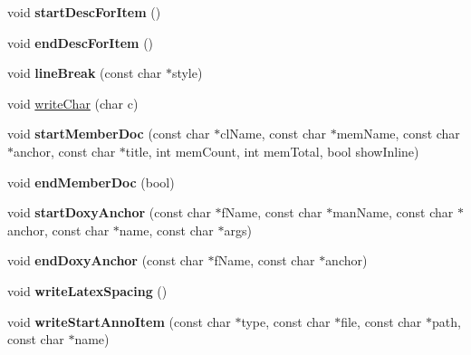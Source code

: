 \begin{DoxyCompactItemize}
void {\bfseries start\+Desc\+For\+Item} ()
\item 
\mbox{\label{class_html_generator_a67179d9c17833aacd71619f5046859b3}} 
void {\bfseries end\+Desc\+For\+Item} ()
\item 
\mbox{\label{class_html_generator_a0931c48e06fde3d6fca0940261ea8e4f}} 
void {\bfseries line\+Break} (const char $\ast$style)
\item 
void \mbox{\hyperlink{class_html_generator_a71e6263d7ffef2cc600e289be06c4f33}{write\+Char}} (char c)
\item 
\mbox{\label{class_html_generator_a513f63435525033bd0a3852d1fd19d00}} 
void {\bfseries start\+Member\+Doc} (const char $\ast$cl\+Name, const char $\ast$mem\+Name, const char $\ast$anchor, const char $\ast$title, int mem\+Count, int mem\+Total, bool show\+Inline)
\item 
\mbox{\label{class_html_generator_a7f7fbce45b7f8eb55fb12fe3c4c1740a}} 
void {\bfseries end\+Member\+Doc} (bool)
\item 
\mbox{\label{class_html_generator_a677520cd44ba8306cbaf15387d34d1cd}} 
void {\bfseries start\+Doxy\+Anchor} (const char $\ast$f\+Name, const char $\ast$man\+Name, const char $\ast$anchor, const char $\ast$name, const char $\ast$args)
\item 
\mbox{\label{class_html_generator_a30d8f13a6cd2cdebefe09ac764b6081e}} 
void {\bfseries end\+Doxy\+Anchor} (const char $\ast$f\+Name, const char $\ast$anchor)
\item 
\mbox{\label{class_html_generator_a2dc6c95466bf497d2912cb15d184b53d}} 
void {\bfseries write\+Latex\+Spacing} ()
\item 
\mbox{\label{class_html_generator_ae9cfa1c13442d21af2b84dd56ee9667d}} 
void {\bfseries write\+Start\+Anno\+Item} (const char $\ast$type, const char $\ast$file, const char $\ast$path, const char $\ast$name)
\item 
\mbox{\label{class_html_generator_a12fde29ab455bf9f9080a3b24fca5365}} 

\end{DoxyCompactItemize}
